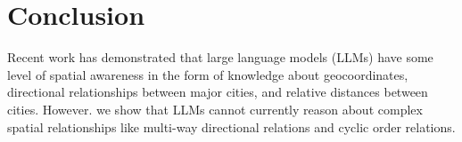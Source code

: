 \section{Conclusion}
\label{section:conclusion}
\normalsize


Recent work has demonstrated that large language models (LLMs) have some level of spatial awareness in the form of knowledge about geocoordinates, directional relationships between major cities, and relative distances between cities.
%
However. we show that LLMs cannot currently reason about complex spatial relationships like multi-way directional relations and cyclic order relations. %
%
%
%


